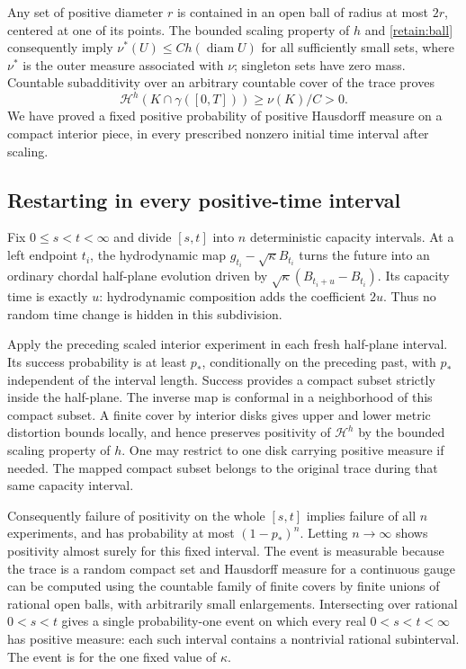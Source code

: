 \documentclass[11pt]{article}
\theoremstyle{definition}
\theoremstyle{remark}
\numberwithin{equation}{section}
\begin{document}
Any set of positive diameter $r$ is contained in an open ball of
radius at most $2r$, centered at one of its points.  The bounded
scaling property of $h$ and \eqref{retain:ball} consequently imply
$\nu^*(U)\le C h(\operatorname{diam}U)$ for all sufficiently small
sets, where $\nu^*$ is the outer measure associated with $\nu$;
singleton sets have zero mass.  Countable subadditivity over an arbitrary
countable cover of the trace proves
\[
 \mathcal H^h(K\cap\gamma([0,T]))\ge \nu(K)/C>0.
\]
We have proved a fixed positive probability of positive Hausdorff
measure on a compact interior piece, in every prescribed nonzero
initial time interval after scaling.

\subsection{Restarting in every positive-time interval}\label{retain:positivity}

Fix $0\le s<t<\infty$ and divide $[s,t]$ into $n$ deterministic
capacity intervals.  At a left endpoint $t_i$, the hydrodynamic map
$g_{t_i}-\sqrt\kappa B_{t_i}$ turns the future into an ordinary
chordal half-plane evolution driven by
$\sqrt\kappa(B_{t_i+u}-B_{t_i})$.  Its capacity time is exactly $u$:
hydrodynamic composition adds the coefficient $2u$.  Thus no random
time change is hidden in this subdivision.

Apply the preceding scaled interior experiment in each fresh
half-plane interval.  Its success probability is at least $p_*$,
conditionally on the preceding past, with $p_*$ independent of the
interval length.  Success provides a compact subset strictly inside
the half-plane.  The inverse map is conformal in a neighborhood of
this compact subset.  A finite cover by interior disks gives upper
and lower metric distortion bounds locally, and hence preserves
positivity of $\mathcal H^h$ by the bounded scaling property of $h$.
One may restrict to one disk carrying positive measure if needed.
The mapped compact subset belongs to the original trace during that
same capacity interval.

Consequently failure of positivity on the whole $[s,t]$ implies
failure of all $n$ experiments, and has probability at most
$(1-p_*)^n$.  Letting $n\to\infty$ shows positivity almost surely for
this fixed interval.  The event is measurable because the trace is
a random compact set and Hausdorff measure for a continuous gauge
can be computed using the countable family of finite covers by
finite unions of rational open balls, with arbitrarily small
enlargements.  Intersecting over rational $0<s<t$ gives a single
probability-one event on which every real $0<s<t<\infty$ has
positive measure: each such interval contains a nontrivial rational
subinterval.  The event is for the one fixed value of $\kappa$.
\end{document}
